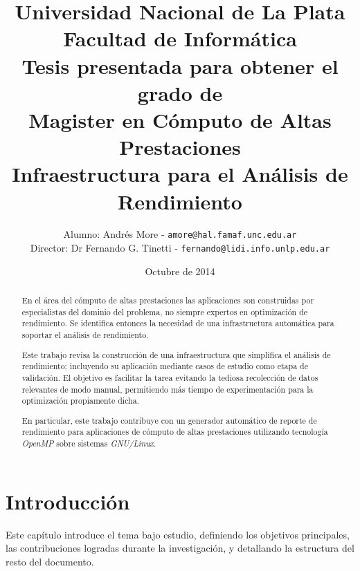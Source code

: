 \documentclass[a4paper]{report}
\begin{document}
\setlength{\parindent}{0cm}
\renewcommand{\tablename}{Tabla}

\title{Universidad Nacional de La Plata\\Facultad de Informática\\ \bigskip
{\large Tesis presentada para obtener el grado de \\}  Magister en Cómputo de Altas Prestaciones\\ \bigskip
  Infraestructura para el Análisis de Rendimiento}

\author{
  Alumno: Andrés More - {\tt amore@hal.famaf.unc.edu.ar}\\
  Director: Dr Fernando G. Tinetti - {\tt fernando@lidi.info.unlp.edu.ar}
}

\date{Octubre de 2014}

\maketitle

\begin{abstract}

En el área del cómputo de altas prestaciones las aplicaciones son construidas por especialistas del dominio del problema, no siempre expertos en optimización de rendimiento. Se identifica entonces la necesidad de una infrastructura automática para soportar el análisis de rendimiento.

\bigskip

Este trabajo revisa la construcción de una infraestructura que simplifica el análisis de rendimiento; incluyendo su aplicación mediante casos de estudio como etapa de validación. El objetivo es facilitar la tarea evitando la tediosa recolección de datos relevantes de modo manual, permitiendo más tiempo de experimentación para la optimización propiamente dicha.

\bigskip

En particular, este trabajo contribuye con un generador automático de reporte de rendimiento para aplicaciones de cómputo de altas prestaciones utilizando tecnología {\it OpenMP} sobre sistemas {\it GNU/Linux}.

\end{abstract}

\tableofcontents

\chapter{Introducción}

Este capítulo introduce el tema bajo estudio, definiendo los objetivos principales, las contribuciones logradas durante la investigación, y detallando la estructura del resto del documento.
\end{document}
